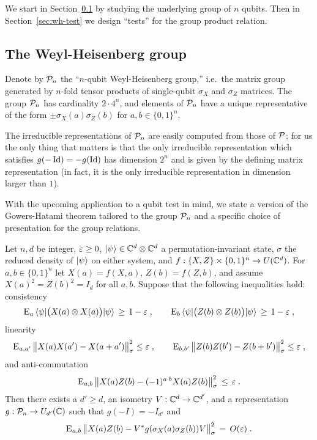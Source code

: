 We start in Section~\ref{sec:wh} by studying the underlying group of $n$ qubits. Then in Section~\ref{sec:wh-test} we design ``tests'' for the group product relation. 

\subsection{The Weyl-Heisenberg group}
\label{sec:wh}

Denote by $\mathcal{P}_n$ the ``$n$-qubit Weyl-Heisenberg group,'' i.e.\ the matrix group generated by $n$-fold tensor products of single-qubit $\sigma_X$ and $\sigma_Z$ matrices. The group $\mathcal{P}_n$ has cardinality $2\cdot 4^n$, and elements of $\mathcal{P}_n$ have a unique representative of the form $\pm \sigma_X(a)\sigma_Z(b)$ for $a,b\in\{0,1\}^n$. 

 The irreducible representations of  $\mathcal{P}_n$ are easily computed from those of $\mathcal{P}$; for us the only thing that matters is that the only irreducible representation which satisfies $g(-\mathop{\rm Id}\nolimits)=-g(\mathop{\rm Id}\nolimits)$ has dimension $2^n$ and is given by the defining matrix representation (in fact, it is the only irreducible representation in dimension larger than $1$).

With the upcoming application to a qubit test in mind, 
we state a version of the Gowers-Hatami theorem tailored to the group $\mathcal{P}_n$ and a specific choice of presentation for the group relations. 

\begin{corollary}\label{cor:gh}
Let $n,d$ be integer, $\varepsilon \geq 0$, $|\psi\rangle \in \mathbb{C}^d \otimes \mathbb{C}^d$ a permutation-invariant state, $\sigma$ the reduced density of $|\psi\rangle$ on either system,  and $f: \{X,Z\}\times \{0,1\}^n \to U(\mathbb{C}^d)$. For $a,b\in\{0,1\}^n$ let $X(a)=f(X,a)$, $Z(b)=f(Z,b)$, and assume $X(a)^2=Z(b)^2=I_d$ for all $a,b$. Suppose that the following inequalities hold: consistency
\begin{equation}\label{eq:gh-cons}
 \textsc{E}_{a} \, \langle\psi| \big(X(a) \otimes X(a)\big) |\psi\rangle \,\geq\,1-\varepsilon\;,\qquad \textsc{E}_{b} \,\langle\psi| \big(Z(b) \otimes Z(b) \big)|\psi\rangle\,\geq\,1-\varepsilon\;,
\end{equation}
linearity
\begin{equation}\label{eq:gh-commute}
 \textsc{E}_{a,a'} \,\big\|X(a)X(a')-X(a+a')\big\|_\sigma^2 \leq \varepsilon\;,\qquad\textsc{E}_{b,b'}\, \big\|Z(b)Z(b')-Z(b+b')\big\|_\sigma^2 \leq \varepsilon\;,
\end{equation}
and anti-commutation
\begin{equation}\label{eq:gh-ac}
 \textsc{E}_{a,b} \,\big\| X(a)Z(b)-(-1)^{a\cdot b} X(a)Z(b)\big\|_\sigma^2\,\leq\,\varepsilon\;.
\end{equation}
Then there exists a $d'\geq d$, an isometry $V:\mathbb{C}^d\to \mathbb{C}^{d'}$, and a representation $g:\mathcal{P}_n\to U_{d'}(\mathbb{C})$ such that $g(-I)=-I_{d'}$ and
$$\textsc{E}_{a,b}\, \big\| X(a)Z(b) - V^*g(\sigma_X(a)\sigma_Z(b))V \big\|_\sigma^2 \,=\, O(\varepsilon)\;.$$
\end{corollary}

